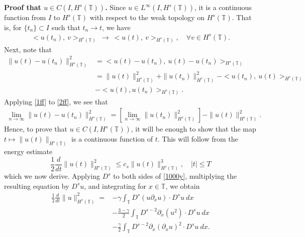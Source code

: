 \documentclass[12pt,reqno]{amsart}
\newcommand{\p}{\partial}
\newcommand{\ci}{\mathbb{T}}
\theoremstyle{plain}  %
\theoremstyle{definition}
\begin{document}
{\bf Proof that $u \in C(I, H^s(\ci))$.} Since $u \in L^\infty(I, 
H^s(\ci))$, it is a
continuous function from $I$ to $H^s(\ci)$ with respect to the weak
topology on $H^s(\ci)$. That is, for $\{t_n\} \subset I$ such that $t_n \to t$, we
have
%
%
\begin{equation}
\begin{split}
<u(t_n), \ v>_{H^s(\ci)} \ \longrightarrow \
<u(t), \ v>_{H^s(\ci)}, \quad \forall
v \in H^s(\ci).
\label{1ff}
\end{split}
\end{equation}
%
%
Next, note that
%
%
\begin{equation}
\begin{split}
 \|u(t) - u(t_n) \|_{H^s(\ci)}^2
& = <u(t) - u(t_n), \ u(t) -
u(t_n)>_{H^s(\ci)}
\\
& = \|u(t)\|_{H^s(\ci)}^2 + \|u(t_n)\|_{H^s(\ci)}^2
 - <u(t_n), \
u(t) >_{H^s(\ci)} 
\\
& - <u(t), u(t_n)>_{H^s(\ci)}.
\label{2ff}
\end{split}
\end{equation}
%
%
%
%
Applying \eqref{1ff} to \eqref{2ff}, we see that
%
%
\begin{equation}
\begin{split}
\lim_{n \to \infty} \|u(t) - u(t_n)\|_{H^s(\ci)}^2 = \left[ \lim_{n
\to \infty} \|u(t_n)\|_{H^s(\ci)}^2
\right] - \|u(t)\|_{H^s(\ci)}^2.
\label{3ff}
\end{split}
\end{equation}
%
%
Hence, to prove that $u \in C(I, H^s(\ci))$, it will be
enough to show that the map $t \mapsto \|u(t)\|_{H^s(\ci)}$ is a continuous
function of $t$. This will follow from the energy
estimate
%
%
\begin{equation}
\label{en-est-u}
\frac{1}{2} \frac{d}{dt} \|u(t)\|_{H^s(\ci)}^2
\le c_s \|u(t)\|_{H^s(\ci)}^3, \quad |t| \le T
\end{equation}
%
%
which we now derive. Applying $D^s$ to both sides of
\eqref{1000y}, multiplying the
resulting equation by $D^s u$, and integrating for $x\in \ci$, we obtain
%
%
\begin{equation}
\begin{split}
\label{bound-int}
 \frac 12
 \frac{d}{dt} \|u \|_{H^s(\ci)}^2
 =
& -
\gamma \int_{\ci}   D^s (u \p_x u) \cdot
D^s u \  dx
\\
& - \frac{3 -\gamma}{2} \int_{\ci}  D^{s-2} \p_x (u^2) \cdot D^s u \ dx
\\
& - \frac{\gamma}{2} \int_{\ci}   D^{s-2} \p_x (\p_x u)^2
\cdot D^s u \ dx.
\end{split}
\end{equation}
\end{document}
